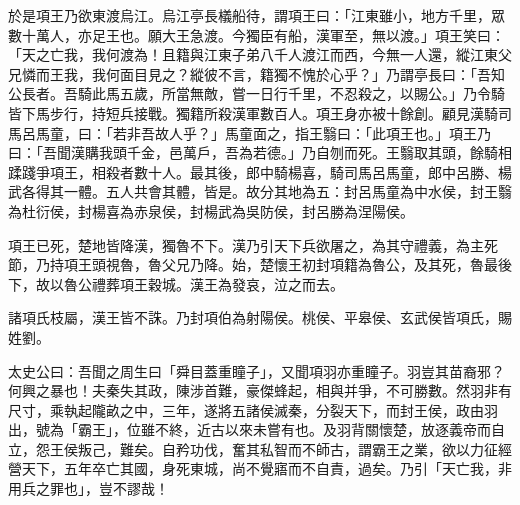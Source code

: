 \begin{pinyinscope}
於是項王乃欲東渡烏江。烏江亭長檥船待，謂項王曰：「江東雖小，地方千里，眾數十萬人，亦足王也。願大王急渡。今獨臣有船，漢軍至，無以渡。」項王笑曰：「天之亡我，我何渡為！且籍與江東子弟八千人渡江而西，今無一人還，縱江東父兄憐而王我，我何面目見之？縱彼不言，籍獨不愧於心乎？」乃謂亭長曰：「吾知公長者。吾騎此馬五歲，所當無敵，嘗一日行千里，不忍殺之，以賜公。」乃令騎皆下馬步行，持短兵接戰。獨籍所殺漢軍數百人。項王身亦被十餘創。顧見漢騎司馬呂馬童，曰：「若非吾故人乎？」馬童面之，指王翳曰：「此項王也。」項王乃曰：「吾聞漢購我頭千金，邑萬戶，吾為若德。」乃自刎而死。王翳取其頭，餘騎相蹂踐爭項王，相殺者數十人。最其後，郎中騎楊喜，騎司馬呂馬童，郎中呂勝、楊武各得其一體。五人共會其體，皆是。故分其地為五：封呂馬童為中水侯，封王翳為杜衍侯，封楊喜為赤泉侯，封楊武為吳防侯，封呂勝為涅陽侯。

項王已死，楚地皆降漢，獨魯不下。漢乃引天下兵欲屠之，為其守禮義，為主死節，乃持項王頭視魯，魯父兄乃降。始，楚懷王初封項籍為魯公，及其死，魯最後下，故以魯公禮葬項王穀城。漢王為發哀，泣之而去。

諸項氏枝屬，漢王皆不誅。乃封項伯為射陽侯。桃侯、平皋侯、玄武侯皆項氏，賜姓劉。

太史公曰：吾聞之周生曰「舜目蓋重瞳子」，又聞項羽亦重瞳子。羽豈其苗裔邪？何興之暴也！夫秦失其政，陳涉首難，豪傑蜂起，相與并爭，不可勝數。然羽非有尺寸，乘執起隴畝之中，三年，遂將五諸侯滅秦，分裂天下，而封王侯，政由羽出，號為「霸王」，位雖不終，近古以來未嘗有也。及羽背關懷楚，放逐義帝而自立，怨王侯叛己，難矣。自矜功伐，奮其私智而不師古，謂霸王之業，欲以力征經營天下，五年卒亡其國，身死東城，尚不覺寤而不自責，過矣。乃引「天亡我，非用兵之罪也」，豈不謬哉！


\end{pinyinscope}